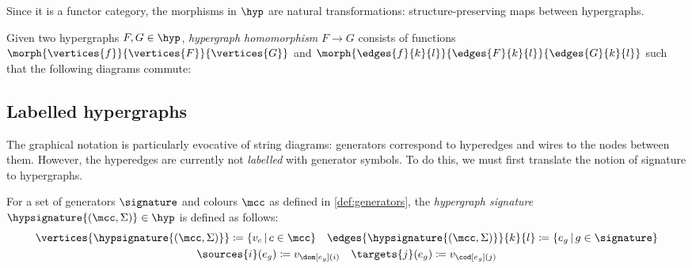 Since it is a functor category, the morphisms in \(\hyp\) are natural
transformations: structure-preserving maps between hypergraphs.

\begin{definition}
    Given two hypergraphs \(F, G \in \hyp\), \emph{hypergraph homomorphism}
    \(F \to G\) consists of functions
    \(\morph{\vertices{f}}{\vertices{F}}{\vertices{G}}\) and
    \(\morph{\edges{f}{k}{l}}{\edges{F}{k}{l}}{\edges{G}{k}{l}}\) such that the
    following diagrams commute:
    
\end{definition}

\subsection{Labelled hypergraphs}

The graphical notation is particularly evocative of string diagrams: generators
correspond to hyperedges and wires to the nodes between them.
However, the hyperedges are currently not \emph{labelled} with generator
symbols.
To do this, we must first translate the notion of signature to hypergraphs.

\begin{definition}
    For a set of generators \(\signature\) and colours \(\mcc\) as defined
    in \cref{def:generators}, the \emph{hypergraph signature}
    \(\hypsignature{(\mcc,\Sigma)} \in \hyp\) is defined as follows:
    \begin{gather*}
        \vertices{\hypsignature{(\mcc,\Sigma)}} \coloneqq \{ v_c \,|\, c \in \mcc\}
        \quad
        \edges{\hypsignature{(\mcc,\Sigma)}}{k}{l} \coloneqq \{ e_g \,|\, g \in \signature\}
        \\
        \sources{i}(e_g) \coloneqq v_{\dom[e_g](i)}
        \quad
        \targets{j}(e_g) \coloneqq v_{\cod[e_g](j)}
    \end{gather*}
\end{definition}


